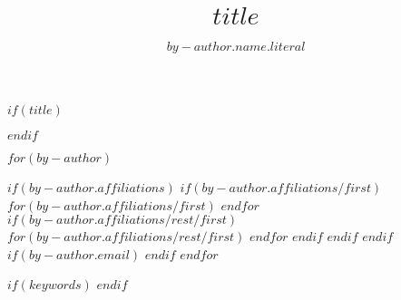$if(title)$
\title{$title$}
$endif$

$for(by-author)$
\author{$by-author.name.literal$}%
$if(by-author.affiliations)$
$if(by-author.affiliations/first)$
$for(by-author.affiliations/first)$
%
$endfor$
$if(by-author.affiliations/rest/first)$
$for(by-author.affiliations/rest/first)$
%
$endfor$
$endif$
$endif$
$endif$
$if(by-author.email)$
$endif$
$endfor$

$if(keywords)$
$endif$